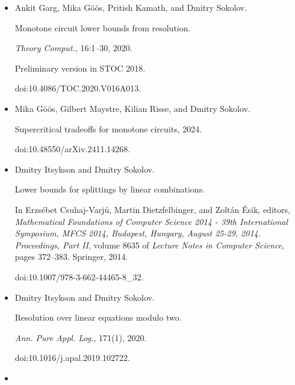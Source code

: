 \documentclass[10pt,a4paper]{article}
\begin{document}
\begin{itemize}
\emph{J. ACM}, 52(6):835–865, 2005.


doi:10.1145/1101821.1101822.





\item[] 
[17]

Ankit Garg, Mika Göös, Pritish Kamath, and Dmitry Sokolov.


Monotone circuit lower bounds from resolution.


\emph{Theory Comput.}, 16:1–30, 2020.


Preliminary version in STOC 2018.


doi:10.4086/TOC.2020.V016A013.





\item[] 
[18]

Mika Göös, Gilbert Maystre, Kilian Risse, and Dmitry Sokolov.


Supercritical tradeoffs for monotone circuits, 2024.


doi:10.48550/arXiv.2411.14268.





\item[] 
[19]

Dmitry Itsykson and Dmitry Sokolov.


Lower bounds for splittings by linear combinations.


In Erzsébet Csuhaj-Varjú, Martin Dietzfelbinger, and
Zoltán Ésik, editors, \emph{Mathematical Foundations of Computer
Science 2014 - 39th International Symposium, MFCS 2014, Budapest, Hungary,
August 25-29, 2014. Proceedings, Part II}, volume 8635 of \emph{Lecture
Notes in Computer Science}, pages 372–383. Springer, 2014.


doi:10.1007/978-3-662-44465-8\_32.





\item[] 
[20]

Dmitry Itsykson and Dmitry Sokolov.


Resolution over linear equations modulo two.


\emph{Ann. Pure Appl. Log.}, 171(1), 2020.


doi:10.1016/j.apal.2019.102722.





\item[] 
[21]


\end{itemize}
\end{document}
